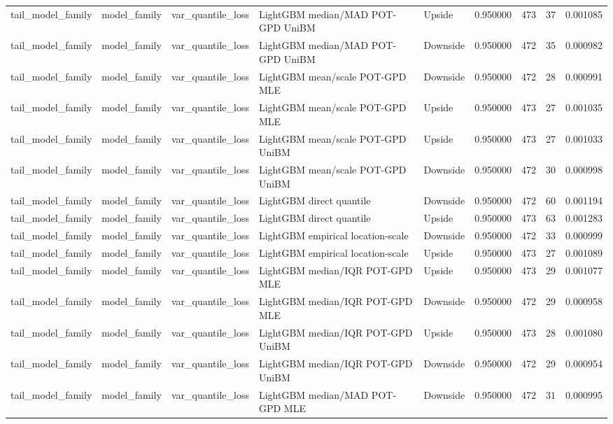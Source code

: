 \begin{tabular}{lllllrrr}
tail\_model\_family & model\_family & var\_quantile\_loss & LightGBM median/MAD POT-GPD UniBM & Upside & 0.950000 & 473 & 37 & 0.001085 \\
tail\_model\_family & model\_family & var\_quantile\_loss & LightGBM median/MAD POT-GPD UniBM & Downside & 0.950000 & 472 & 35 & 0.000982 \\
tail\_model\_family & model\_family & var\_quantile\_loss & LightGBM mean/scale POT-GPD MLE & Downside & 0.950000 & 472 & 28 & 0.000991 \\
tail\_model\_family & model\_family & var\_quantile\_loss & LightGBM mean/scale POT-GPD MLE & Upside & 0.950000 & 473 & 27 & 0.001035 \\
tail\_model\_family & model\_family & var\_quantile\_loss & LightGBM mean/scale POT-GPD UniBM & Upside & 0.950000 & 473 & 27 & 0.001033 \\
tail\_model\_family & model\_family & var\_quantile\_loss & LightGBM mean/scale POT-GPD UniBM & Downside & 0.950000 & 472 & 30 & 0.000998 \\
tail\_model\_family & model\_family & var\_quantile\_loss & LightGBM direct quantile & Downside & 0.950000 & 472 & 60 & 0.001194 \\
tail\_model\_family & model\_family & var\_quantile\_loss & LightGBM direct quantile & Upside & 0.950000 & 473 & 63 & 0.001283 \\
tail\_model\_family & model\_family & var\_quantile\_loss & LightGBM empirical location-scale & Downside & 0.950000 & 472 & 33 & 0.000999 \\
tail\_model\_family & model\_family & var\_quantile\_loss & LightGBM empirical location-scale & Upside & 0.950000 & 473 & 27 & 0.001089 \\
tail\_model\_family & model\_family & var\_quantile\_loss & LightGBM median/IQR POT-GPD MLE & Upside & 0.950000 & 473 & 29 & 0.001077 \\
tail\_model\_family & model\_family & var\_quantile\_loss & LightGBM median/IQR POT-GPD MLE & Downside & 0.950000 & 472 & 29 & 0.000958 \\
tail\_model\_family & model\_family & var\_quantile\_loss & LightGBM median/IQR POT-GPD UniBM & Upside & 0.950000 & 473 & 28 & 0.001080 \\
tail\_model\_family & model\_family & var\_quantile\_loss & LightGBM median/IQR POT-GPD UniBM & Downside & 0.950000 & 472 & 29 & 0.000954 \\
tail\_model\_family & model\_family & var\_quantile\_loss & LightGBM median/MAD POT-GPD MLE & Downside & 0.950000 & 472 & 31 & 0.000995 \\

\end{tabular}
